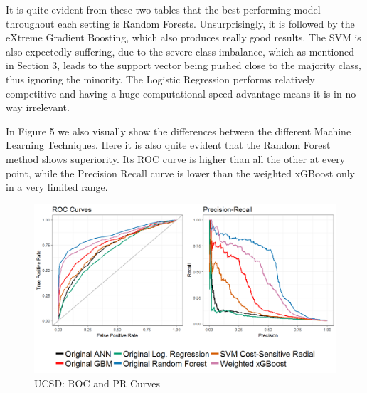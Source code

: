 \documentclass[12pt,]{article}
\begin{document}
\begin{table}

\caption{\label{tab:ucsd_model_PR}UCSD: PR Metric Model Variations}
\centering
{}
\end{table}

It is quite evident from these two tables that the best performing model
throughout each setting is Random Forests. Unsurprisingly, it is
followed by the eXtreme Gradient Boosting, which also produces really
good results. The SVM is also expectedly suffering, due to the severe
class imbalance, which as mentioned in Section 3, leads to the support
vector being pushed close to the majority class, thus ignoring the
minority. The Logistic Regression performs relatively competitive and
having a huge computational speed advantage means it is in no way
irrelevant.

In Figure 5 we also visually show the differences between the different
Machine Learning Techniques. Here it is also quite evident that the
Random Forest method shows superiority. Its ROC curve is higher than all
the other at every point, while the Precision Recall curve is lower than
the weighted xGBoost only in a very limited range.

\begin{figure}
\centering
\includegraphics[width=1\textwidth,height=\textheight]{figures/ucsd/ucsd_pr_roc.png}
\caption{UCSD: ROC and PR Curves}
\end{figure}
\end{document}
